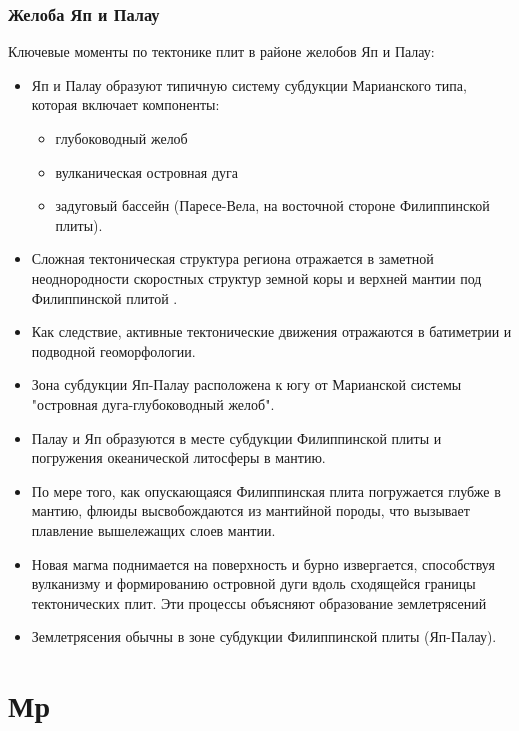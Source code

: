 \documentclass[pdflatex,compress,8pt,
	xcolor={dvipsnames,dvipsnames,svgnames,x11names,table},
	hyperref={colorlinks = true,breaklinks = true, urlcolor = NavyBlue}]{beamer}
\begin{document}
\begin{frame}\frametitle{Желоба Яп и Палау}
Ключевые моменты по тектонике плит в районе желобов Яп и Палау: 
\begin{itemize}
	\item Яп и Палау образуют типичную систему субдукции Марианского типа, которая включает компоненты:
	\begin{itemize}
         	   \item глубоководный желоб
         	   \item вулканическая островная дуга
         	   \item задуговый бассейн (Паресе-Вела, на восточной стороне Филиппинской плиты).
	\end{itemize}
	\item Сложная тектоническая структура региона отражается в заметной неоднородности скоростных структур земной коры и верхней мантии под Филиппинской плитой \cite{OdaSenna1994}. 
	\item Как следствие, активные тектонические движения отражаются в батиметрии и подводной геоморфологии.	
	\item Зона субдукции Яп-Палау расположена к югу от Марианской системы "островная дуга-глубоководный желоб".
	\item Палау и Яп образуются в месте субдукции Филиппинской плиты и погружения океанической литосферы в мантию.
	\item По мере того, как опускающаяся Филиппинская плита погружается глубже в мантию, флюиды высвобождаются из мантийной породы, что вызывает плавление вышележащих слоев мантии.
	\item Новая магма поднимается на поверхность и бурно извергается, способствуя вулканизму и формированию островной дуги вдоль сходящейся границы тектонических плит. Эти процессы объясняют образование землетрясений
	\item Землетрясения обычны в зоне субдукции Филиппинской плиты (Яп-Палау). 
\end{itemize}
\end{frame}


\section{Мр}
\end{document}
